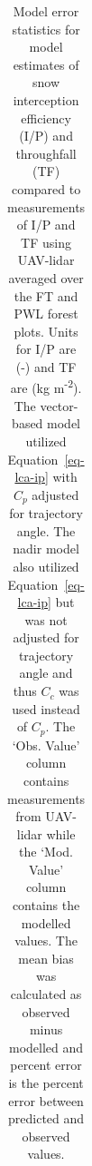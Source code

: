 \documentclass[
  letterpaper,
  DIV=11,
  numbers=noendperiod]{scrartcl}
\begin{document}
\pagebreak

\begin{longtable}[]{@{}
  >{\raggedright\arraybackslash}p{}
  >{\raggedright\arraybackslash}p{}
  >{\raggedright\arraybackslash}p{}
  >{\raggedright\arraybackslash}p{}
  >{\raggedleft\arraybackslash}p{}
  >{\raggedleft\arraybackslash}p{}
  >{\raggedleft\arraybackslash}p{}
  >{\raggedleft\arraybackslash}p{}@{}}

\caption{\label{tbl-vb-plot-err}Model error statistics for model
estimates of snow interception efficiency (I/P) and throughfall (TF)
compared to measurements of I/P and TF using UAV-lidar averaged over the
FT and PWL forest plots. Units for I/P are (-) and TF are (kg
m\textsuperscript{-2}). The vector-based model utilized
Equation~\ref{eq-lca-ip} with \(C_p\) adjusted for trajectory angle. The
nadir model also utilized Equation~\ref{eq-lca-ip} but was not adjusted
for trajectory angle and thus \(C_c\) was used instead of \(C_p\). The
`Obs. Value' column contains measurements from UAV-lidar while the `Mod.
Value' column contains the modelled values. The mean bias was calculated
as observed minus modelled and percent error is the percent error
between predicted and observed values.}

\tabularnewline


\end{longtable}
\end{document}
